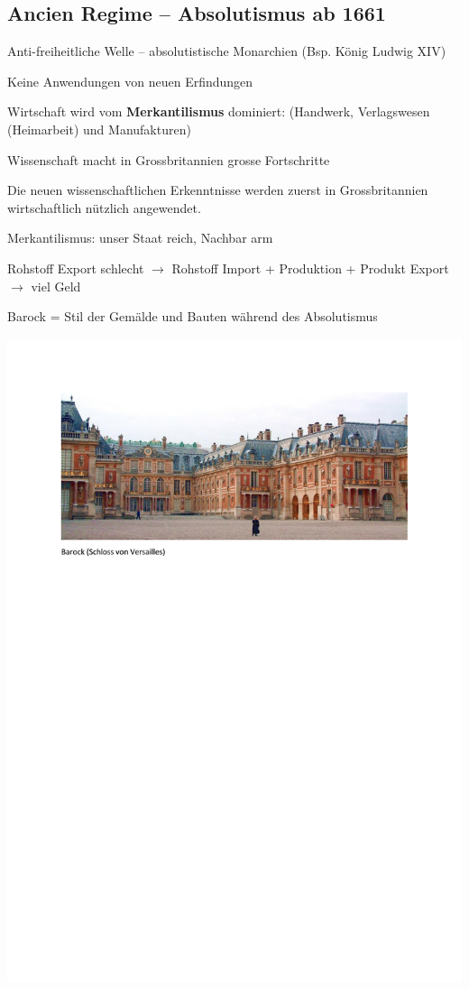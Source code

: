 \documentclass[10pt, openright=true]{scrartcl}
\begin{document}
\subsection{Ancien Regime – Absolutismus ab 1661}
\begin{citemize}
	\item Anti-freiheitliche Welle – absolutistische Monarchien (Bsp. König Ludwig XIV)
	\item Keine Anwendungen von neuen Erfindungen
	\item Wirtschaft wird vom \textbf{Merkantilismus} dominiert: (Handwerk, Verlagswesen (Heimarbeit) und Manufakturen)
	\item Wissenschaft macht in Grossbritannien grosse Fortschritte
	\item Die neuen wissenschaftlichen Erkenntnisse werden zuerst in Grossbritannien wirtschaftlich nützlich angewendet.
	\item Merkantilismus: unser Staat reich, Nachbar arm
	\item Rohstoff Export schlecht $ \rightarrow $ Rohstoff Import + Produktion + Produkt Export $ \rightarrow $ viel Geld
	\item Barock = Stil der Gemälde und Bauten während des Absolutismus \vspace{0.5cm}
\end{citemize}
\includegraphics[width=1\textwidth]{images/Barock}
\clearpage
\end{document}
